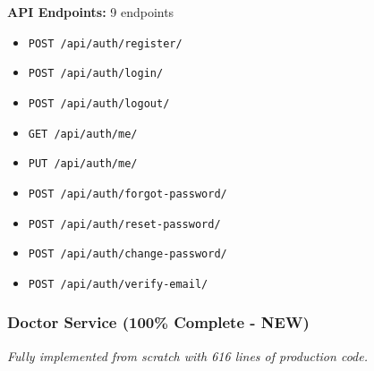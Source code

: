 \documentclass[12pt,a4paper]{article}
\begin{document}
\textbf{API Endpoints:} 9 endpoints
\begin{itemize}[noitemsep]
    \item \texttt{POST /api/auth/register/}
    \item \texttt{POST /api/auth/login/}
    \item \texttt{POST /api/auth/logout/}
    \item \texttt{GET /api/auth/me/}
    \item \texttt{PUT /api/auth/me/}
    \item \texttt{POST /api/auth/forgot-password/}
    \item \texttt{POST /api/auth/reset-password/}
    \item \texttt{POST /api/auth/change-password/}
    \item \texttt{POST /api/auth/verify-email/}
\end{itemize}

\subsubsection{Doctor Service (100\% Complete - NEW)}
\textit{Fully implemented from scratch with 616 lines of production code.}
\end{document}
